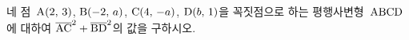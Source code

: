 네 점~$\mathrm{A}(2,\mkern3mu 3)$, $\mathrm{B}(-2,\mkern3mu a)$, $\mathrm{C}(4,\mkern3mu -a)$, $\mathrm{D}(b,\mkern3mu 1)$을 꼭짓점으로 하는 평행사변형~$\mathrm{ABCD}$에 대하여 $\overline{\mathrm{AC}}^2+\overline{\mathrm{BD}}^2$의 값을 구하시오.
